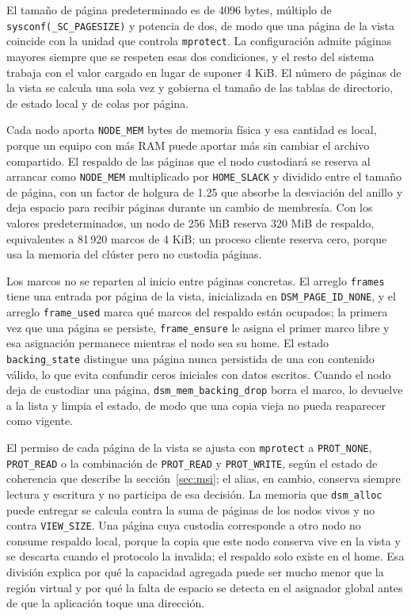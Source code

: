 El tamaño de página predeterminado es de 4096 bytes, múltiplo de \texttt{sysconf(\_SC\_PAGESIZE)} y potencia de dos, de modo que una página de la vista coincide con la unidad que controla \texttt{mprotect}. La configuración admite páginas mayores siempre que se respeten esas dos condiciones, y el resto del sistema trabaja con el valor cargado en lugar de suponer 4 KiB. El número de páginas de la vista se calcula una sola vez y gobierna el tamaño de las tablas de directorio, de estado local y de colas por página.

Cada nodo aporta \texttt{NODE\_MEM} bytes de memoria física y esa cantidad es local, porque un equipo con más RAM puede aportar más sin cambiar el archivo compartido. El respaldo de las páginas que el nodo custodiará se reserva al arrancar como \texttt{NODE\_MEM} multiplicado por \texttt{HOME\_SLACK} y dividido entre el tamaño de página, con un factor de holgura de 1.25 que absorbe la desviación del anillo y deja espacio para recibir páginas durante un cambio de membresía. Con los valores predeterminados, un nodo de 256 MiB reserva 320 MiB de respaldo, equivalentes a 81\,920 marcos de 4 KiB; un proceso cliente reserva cero, porque usa la memoria del clúster pero no custodia páginas.

Los marcos no se reparten al inicio entre páginas concretas. El arreglo \texttt{frames} tiene una entrada por página de la vista, inicializada en \texttt{DSM\_PAGE\_ID\_NONE}, y el arreglo \texttt{frame\_used} marca qué marcos del respaldo están ocupados; la primera vez que una página se persiste, \texttt{frame\_ensure} le asigna el primer marco libre y esa asignación permanece mientras el nodo sea su home. El estado \texttt{backing\_state} distingue una página nunca persistida de una con contenido válido, lo que evita confundir ceros iniciales con datos escritos. Cuando el nodo deja de custodiar una página, \texttt{dsm\_mem\_backing\_drop} borra el marco, lo devuelve a la lista y limpia el estado, de modo que una copia vieja no pueda reaparecer como vigente.

El permiso de cada página de la vista se ajusta con \texttt{mprotect} a \texttt{PROT\_NONE}, \texttt{PROT\_READ} o la combinación de \texttt{PROT\_READ} y \texttt{PROT\_WRITE}, según el estado de coherencia que describe la sección~\ref{sec:msi}; el alias, en cambio, conserva siempre lectura y escritura y no participa de esa decisión. La memoria que \texttt{dsm\_alloc} puede entregar se calcula contra la suma de páginas de los nodos vivos y no contra \texttt{VIEW\_SIZE}. Una página cuya custodia corresponde a otro nodo no consume respaldo local, porque la copia que este nodo conserva vive en la vista y se descarta cuando el protocolo la invalida; el respaldo solo existe en el home. Esa división explica por qué la capacidad agregada puede ser mucho menor que la región virtual y por qué la falta de espacio se detecta en el asignador global antes de que la aplicación toque una dirección.

